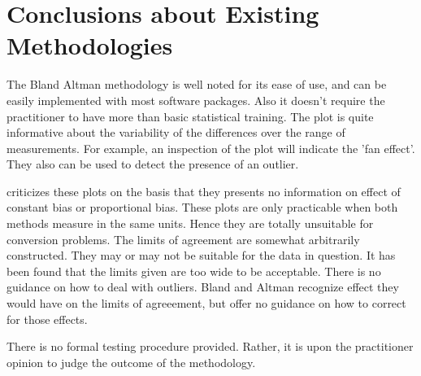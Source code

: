 \documentclass[12pt, a4paper]{report}
\theoremstyle{plain}
\theoremstyle{definition}
\theoremstyle{remark}
\begin{document}
	
	
	

	\section{Conclusions about Existing Methodologies}
	
	The Bland Altman methodology is well noted for its ease of use,
	and can be easily implemented with most software packages. Also it
	doesn't require the practitioner to have more than basic
	statistical training. The plot is quite informative about the
	variability of the differences over the range of measurements. For
	example, an inspection of the plot will indicate the 'fan effect'.
	They also can be used to detect the presence of an outlier.
	
	\citet{ludbrook97,ludbrook02} criticizes these plots on the
	basis that they presents no information on effect of constant bias
	or proportional bias. These plots are only practicable when both
	methods measure in the same units. Hence they are totally
	unsuitable for conversion problems. The limits of agreement are
	somewhat arbitrarily constructed. They may or may not be suitable
	for the data in question. It has been found that the limits given
	are too wide to be acceptable. There is no guidance on how to deal
	with outliers. Bland and Altman recognize effect they would have
	on the limits of agreeement, but offer no guidance on how to
	correct for those effects.
	
	There is no formal testing procedure provided. Rather, it is upon
	the practitioner opinion to judge the outcome of the methodology.
	
	
	
	
	
	
	
	
\end{document}
